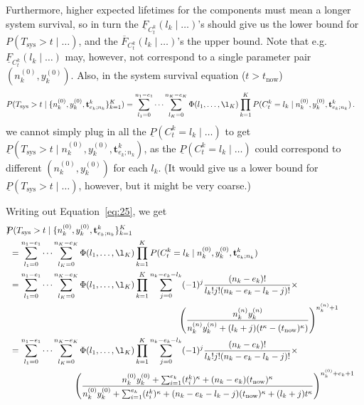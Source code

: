 \documentclass[12pt,a4paper,fleqn]{narms}
\newcommand{\mbf}[1]{\mathbf{#1}}
\newcommand{\uz}{^{(0)}} %
\newcommand{\un}{^{(n)}} %
\newcommand{\ul}[1]{\underline{#1}}
\newcommand{\ol}[1]{\overline{#1}}
\def\Tsys{T_\text{sys}}
\def\ykz{y\uz_k}
\def\ykn{y\un_k}
\def\nkz{n\uz_k}
\def\nkn{n\un_k}
\def\tnow{t_\text{now}}
\begin{document}
Furthermore, higher expected lifetimes for the components must mean
a longer system survival, so in turn the $\ul{F}_{C^k_t}(l_k \mid \ldots)$'s
should give us the lower bound for $P(\Tsys > t\mid\ldots)$,
and the $\ol{F}_{C^k_t}(l_k \mid \ldots)$'s the upper bound.
Note that e.g.\ $\ul{F}_{C^k_t}(l_k \mid \ldots)$ may, however, not correspond to a single parameter pair $(\nkz, \ykz)$.
Also, in the system survival equation ($t > \tnow$)
\begin{align} \label{eq:25}
P(\Tsys > t\mid\{\nkz,\ykz, \mbf{t}^k_{e_k;n_k}\}_{k=1}^K)
 &= \sum_{l_1=0}^{n_1-e_1} \cdots \sum_{l_K=0}^{n_K-e_K} \Phi(l_1,\ldots,\l_K) \prod_{k=1}^K
    P(C^k_t = l_k\mid\nkz,\ykz, \mbf{t}^k_{e_k;n_k}) \,.
\end{align}
we cannot simply plug in all the $\ul{P}(C^k_t = l_k\mid \ldots)$ %
to get $\ul{P}(\Tsys > t\mid\nkz,\ykz, \mbf{t}^k_{e_k;n_k})$, %
as the $\ul{P}(C^k_t = l_k\mid \ldots)$ could correspond to different $(\nkz,\ykz)$ for each $l_k$.
(It would give us a lower bound for $\ul{P}(\Tsys > t\mid\ldots)$, however, but it might be very coarse.)

Writing out Equation~\eqref{eq:25}, we get
\begin{align}
\lefteqn{P(\Tsys > t\mid\{\nkz,\ykz, \mbf{t}^k_{e_k;n_k}\}_{k=1}^K}) \\
 &= \sum_{l_1=0}^{n_1-e_1} \cdots \sum_{l_K=0}^{n_K-e_K} \Phi(l_1,\ldots,\l_K) \prod_{k=1}^K
    P(C^k_t = l_k\mid\nkz,\ykz, \mbf{t}^k_{e_k;n_k}) \\
 &= \sum_{l_1=0}^{n_1-e_1} \cdots \sum_{l_K=0}^{n_K-e_K} \Phi(l_1,\ldots,\l_K) \prod_{k=1}^K
    \sum_{j=0}^{n_k-e_k-l_k} (-1)^j \frac{(n_k - e_k)!}{l_k! j! (n_k - e_k - l_k - j)!} \times \\ & \hspace*{45ex}
    \left(\frac{\nkn\ykn}{\nkn\ykn + (l_k + j) (t^\kappa - (\tnow)^\kappa)}\right)^{\nkn + 1} \\
 &= \sum_{l_1=0}^{n_1-e_1} \cdots \sum_{l_K=0}^{n_K-e_K} \Phi(l_1,\ldots,\l_K) \prod_{k=1}^K \label{eq:30}
    \sum_{j=0}^{n_k-e_k-l_k} (-1)^j \frac{(n_k - e_k)!}{l_k! j! (n_k - e_k - l_k - j)!} \times \\ & \hspace*{17ex}
    \left(\frac{\nkz\ykz + \sum_{i=1}^{e_k} (t_i^k)^\kappa + (n_k-e_k) (\tnow)^\kappa }%
               {\nkz\ykz + \sum_{i=1}^{e_k} (t_i^k)^\kappa + (n_k-e_k-l_k-j) (\tnow)^\kappa + (l_k + j) t^\kappa }\right)^{%
    \nkz + e_k + 1} 
\end{align}
\end{document}
